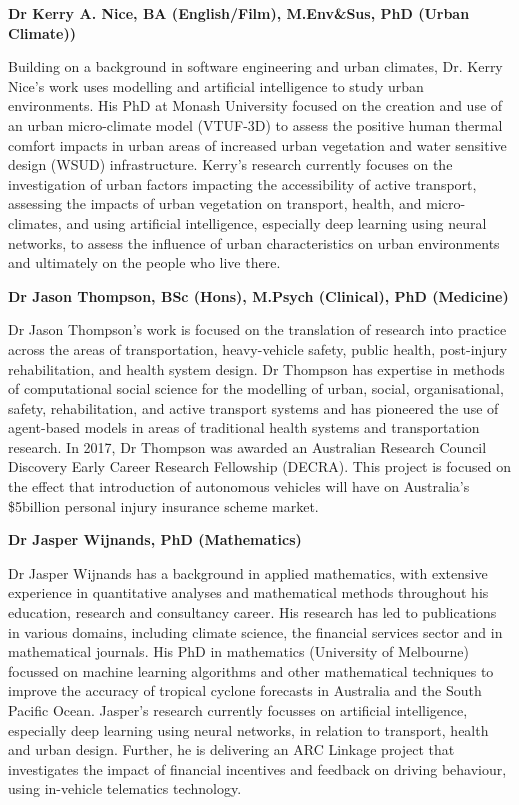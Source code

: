 \documentclass[Crown,sageh,times]{sagej}
\begin{document}
\theendnotes

  
  

\begin{biogs}
\textbf{Dr Kerry A. Nice, BA (English/Film), M.Env\&Sus, PhD (Urban Climate))}

Building on a background in software engineering and urban climates, Dr. Kerry Nice's work uses modelling and artificial intelligence to study urban environments. His PhD at Monash University focused on the creation and use of an urban micro-climate model (VTUF-3D) to assess the positive human thermal comfort impacts in urban areas of increased urban vegetation and water sensitive design (WSUD) infrastructure. Kerry's research currently focuses on the investigation of urban factors impacting the accessibility of active transport, assessing the impacts of urban vegetation on transport, health, and micro-climates, and using artificial intelligence, especially deep learning using neural networks, to assess the influence of urban characteristics on urban environments and ultimately on the people who live there.

\textbf{Dr Jason Thompson, BSc (Hons), M.Psych (Clinical), PhD (Medicine)}

Dr Jason Thompson’s work is focused on the translation of research into practice across the areas of transportation, heavy-vehicle safety, public health, post-injury rehabilitation, and health system design. Dr Thompson has expertise in methods of computational social science for the modelling of urban, social, organisational, safety, rehabilitation, and active transport systems and has pioneered the use of agent-based models in areas of traditional health systems and transportation research. In 2017, Dr Thompson was awarded an Australian Research Council Discovery Early Career Research Fellowship (DECRA). This project is focused on the effect that introduction of autonomous vehicles will have on Australia’s \$5billion personal injury insurance scheme market.

\textbf{Dr Jasper Wijnands, PhD (Mathematics)}

Dr Jasper Wijnands has a background in applied mathematics, with extensive experience in quantitative analyses and mathematical methods throughout his education, research and consultancy career. His research has led to publications in various domains, including climate science, the financial services sector and in mathematical journals. His PhD in mathematics (University of Melbourne) focussed on machine learning algorithms and other mathematical techniques to improve the accuracy of tropical cyclone forecasts in Australia and the South Pacific Ocean. Jasper’s research currently focusses on artificial intelligence, especially deep learning using neural networks, in relation to transport, health and urban design. Further, he is delivering an ARC Linkage project that investigates the impact of financial incentives and feedback on driving behaviour, using in-vehicle telematics technology.


\end{biogs}
\end{document}
